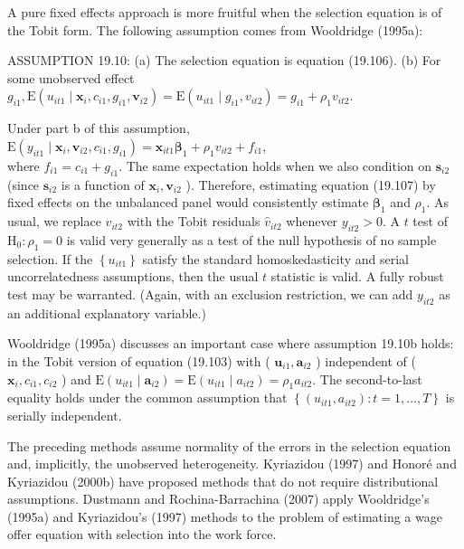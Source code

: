 \documentclass[10pt]{article}
\begin{document}
A pure fixed effects approach is more fruitful when the selection equation is of the Tobit form. The following assumption comes from Wooldridge (1995a):

ASSUMPTION 19.10: (a) The selection equation is equation (19.106). (b) For some unobserved effect $g_{i 1}, \mathrm{E}\left(u_{i t 1} \mid \mathbf{x}_{i}, c_{i 1}, g_{i 1}, \mathbf{v}_{i 2}\right)=\mathrm{E}\left(u_{i t 1} \mid g_{i 1}, v_{i t 2}\right)=g_{i 1}+\rho_{1} v_{i t 2}$.

Under part b of this assumption,\\
$\mathrm{E}\left(y_{i t 1} \mid \mathbf{x}_{i}, \mathbf{v}_{i 2}, c_{i 1}, g_{i 1}\right)=\mathbf{x}_{i t 1} \boldsymbol{\beta}_{1}+\rho_{1} v_{i t 2}+f_{i 1}$,\\
where $f_{i 1}=c_{i 1}+g_{i 1}$. The same expectation holds when we also condition on $\mathbf{s}_{i 2}$ (since $\mathbf{s}_{i 2}$ is a function of $\mathbf{x}_{i}, \mathbf{v}_{i 2}$ ). Therefore, estimating equation (19.107) by fixed effects on the unbalanced panel would consistently estimate $\boldsymbol{\beta}_{1}$ and $\rho_{1}$. As usual, we replace $v_{i t 2}$ with the Tobit residuals $\hat{v}_{i t 2}$ whenever $y_{i t 2}>0$. A $t$ test of $\mathrm{H}_{0}: \rho_{1}=0$ is valid very generally as a test of the null hypothesis of no sample selection. If the $\left\{u_{i t 1}\right\}$ satisfy the standard homoskedasticity and serial uncorrelatedness assumptions, then the usual $t$ statistic is valid. A fully robust test may be warranted. (Again, with an exclusion restriction, we can add $y_{i t 2}$ as an additional explanatory variable.)

Wooldridge (1995a) discusses an important case where assumption 19.10b holds: in the Tobit version of equation (19.103) with ( $\mathbf{u}_{i 1}, \mathbf{a}_{i 2}$ ) independent of ( $\mathbf{x}_{i}, c_{i 1}, c_{i 2}$ ) and $\mathrm{E}\left(u_{i t 1} \mid \mathbf{a}_{i 2}\right)=\mathrm{E}\left(u_{i t 1} \mid a_{i t 2}\right)=\rho_{1} a_{i t 2}$. The second-to-last equality holds under the common assumption that $\left\{\left(u_{i t 1}, a_{i t 2}\right): t=1, \ldots, T\right\}$ is serially independent.

The preceding methods assume normality of the errors in the selection equation and, implicitly, the unobserved heterogeneity. Kyriazidou (1997) and Honoré and Kyriazidou (2000b) have proposed methods that do not require distributional assumptions. Dustmann and Rochina-Barrachina (2007) apply Wooldridge's (1995a) and Kyriazidou's (1997) methods to the problem of estimating a wage offer equation with selection into the work force.
\end{document}
